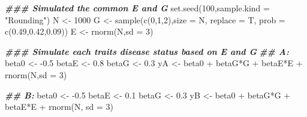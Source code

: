 \documentclass[
]{article}
\newenvironment{Shaded}{\begin{snugshade}}{\end{snugshade}}
\newcommand{\AttributeTok}[1]{\textcolor[rgb]{0.77,0.63,0.00}{#1}}
\newcommand{\DecValTok}[1]{\textcolor[rgb]{0.00,0.00,0.81}{#1}}
\newcommand{\DocumentationTok}[1]{\textcolor[rgb]{0.56,0.35,0.01}{\textbf{\textit{#1}}}}
\newcommand{\FloatTok}[1]{\textcolor[rgb]{0.00,0.00,0.81}{#1}}
\newcommand{\FunctionTok}[1]{\textcolor[rgb]{0.00,0.00,0.00}{#1}}
\newcommand{\NormalTok}[1]{#1}
\newcommand{\OtherTok}[1]{\textcolor[rgb]{0.56,0.35,0.01}{#1}}
\newcommand{\SpecialCharTok}[1]{\textcolor[rgb]{0.00,0.00,0.00}{#1}}
\newcommand{\StringTok}[1]{\textcolor[rgb]{0.31,0.60,0.02}{#1}}
\begin{document}
\begin{Shaded}
\begin{Highlighting}[]
\DocumentationTok{\#\#\# Simulated the common E and G}
\FunctionTok{set.seed}\NormalTok{(}\DecValTok{100}\NormalTok{,}\AttributeTok{sample.kind =} \StringTok{"Rounding"}\NormalTok{)}
\NormalTok{N }\OtherTok{\textless{}{-}} \DecValTok{1000}
\NormalTok{G }\OtherTok{\textless{}{-}} \FunctionTok{sample}\NormalTok{(}\FunctionTok{c}\NormalTok{(}\DecValTok{0}\NormalTok{,}\DecValTok{1}\NormalTok{,}\DecValTok{2}\NormalTok{),}\AttributeTok{size =}\NormalTok{ N, }\AttributeTok{replace =}\NormalTok{ T, }\AttributeTok{prob =} \FunctionTok{c}\NormalTok{(}\FloatTok{0.49}\NormalTok{,}\FloatTok{0.42}\NormalTok{,}\FloatTok{0.09}\NormalTok{))}
\NormalTok{E }\OtherTok{\textless{}{-}} \FunctionTok{rnorm}\NormalTok{(N,}\AttributeTok{sd =} \DecValTok{3}\NormalTok{)}

\DocumentationTok{\#\#\# Simulate each trait\textquotesingle{}s disease status based on E and G}
\DocumentationTok{\#\# A:}
\NormalTok{beta0 }\OtherTok{\textless{}{-}} \SpecialCharTok{{-}}\FloatTok{0.5}
\NormalTok{betaE }\OtherTok{\textless{}{-}} \FloatTok{0.8}
\NormalTok{betaG }\OtherTok{\textless{}{-}} \FloatTok{0.3}
\NormalTok{yA }\OtherTok{\textless{}{-}}\NormalTok{ beta0 }\SpecialCharTok{+}\NormalTok{ betaG}\SpecialCharTok{*}\NormalTok{G }\SpecialCharTok{+}\NormalTok{ betaE}\SpecialCharTok{*}\NormalTok{E }\SpecialCharTok{+} \FunctionTok{rnorm}\NormalTok{(N,}\AttributeTok{sd =} \DecValTok{3}\NormalTok{)}

\DocumentationTok{\#\# B:}
\NormalTok{beta0 }\OtherTok{\textless{}{-}} \SpecialCharTok{{-}}\FloatTok{0.5}
\NormalTok{betaE }\OtherTok{\textless{}{-}} \FloatTok{0.1}
\NormalTok{betaG }\OtherTok{\textless{}{-}} \FloatTok{0.3}
\NormalTok{yB }\OtherTok{\textless{}{-}}\NormalTok{ beta0 }\SpecialCharTok{+}\NormalTok{ betaG}\SpecialCharTok{*}\NormalTok{G }\SpecialCharTok{+}\NormalTok{ betaE}\SpecialCharTok{*}\NormalTok{E }\SpecialCharTok{+} \FunctionTok{rnorm}\NormalTok{(N, }\AttributeTok{sd =} \DecValTok{3}\NormalTok{)}


\end{Highlighting}
\end{Shaded}
\end{document}
